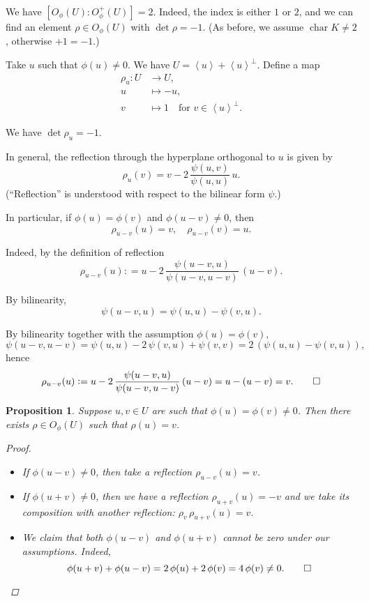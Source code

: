 \documentclass{article}
\newcommand{\dfn}{\mathrel{\mathop:}=}
\DeclareMathOperator{\fchar}{char}
\newcommand{\examplesymbol}{$\blacktriangle$}
\renewcommand{\qedsymbol}{$\blacksquare$}
\theoremstyle{myplain}
\newtheorem{proposition}{Proposition}[section]
\theoremstyle{mydefinition}
\newenvironment{example}
  {\pushQED{\qed}\renewcommand{\qedsymbol}{\examplesymbol}\examplex}
  {\popQED\endexamplex}
\begin{document}
We have $[O_\phi (U) : O_\phi^+ (U)] = 2$. Indeed, the index is either $1$ or
$2$, and we can find an element $\rho \in O_\phi (U)$ with $\det \rho = -1$.
(As before, we assume $\fchar K \ne 2$, otherwise $+1 = -1$.)

\begin{example}
  Take $u$ such that $\phi (u) \ne 0$. We have
  $U = \left<u\right> + \left<u\right>^\perp$. Define a map
  \begin{align*}
    \rho_u\colon U & \to U,\\
    u & \mapsto -u,\\
    v & \mapsto 1 \quad\text{for } v \in \left<u\right>^\perp.
  \end{align*}

  We have $\det \rho_u = -1$.

  In general, the reflection through the hyperplane orthogonal to $u$ is given
  by
  $$\rho_u (v) = v - 2\,\frac{\psi (u,v)}{\psi (u,u)}\,u.$$
  (``Reflection'' is understood with respect to the bilinear form $\psi$.)

  In particular, if $\phi (u) = \phi (v)$ and $\phi (u-v) \ne 0$, then
  $$\rho_{u-v} (u) = v, \quad \rho_{u-v} (v) = u.$$

  Indeed, by the definition of reflection
  $$\rho_{u-v} (u) \dfn u - 2\,\frac{\psi (u-v,u)}{\psi (u-v,u-v)}\,(u-v).$$

  By bilinearity,
  $$\psi (u - v, u) = \psi (u,u) - \psi (v,u).$$

  By bilinearity together with the assumption $\phi (u) = \phi (v)$,
  $$\psi (u-v, u-v) = \psi (u,u) - 2\,\psi (v,u) + \psi (v,v) = 2\,(\psi (u,u) - \psi (v,u)),$$
  hence
  \[ \rho_{u-v} (u) \dfn u - 2\,\frac{\psi (u-v,u)}{\psi (u-v,u-v)}\,(u-v) = u - (u-v) = v. \qedhere \]
\end{example}

\begin{proposition}\label{proposition:rho-u-v}
  Suppose $u,v \in U$ are such that $\phi (u) = \phi (v) \ne 0$. Then there
  exists $\rho \in O_\phi (U)$ such that $\rho (u) = v$.

  \begin{proof}
    \begin{itemize}
    \item If $\phi (u-v) \ne 0$, then take a reflection $\rho_{u-v} (u) = v$.

    \item If $\phi (u+v) \ne 0$, then we have a reflection $\rho_{u+v} (u) = -v$
      and we take its composition with another reflection:
      $\rho_v \, \rho_{u+v} (u) = v$.

    \item We claim that both $\phi (u-v)$ and $\phi (u+v)$ cannot be zero under
      our assumptions. Indeed,
      \[ \phi (u+v) + \phi (u-v) = 2\,\phi(u) + 2\,\phi(v) = 4\,\phi (v) \ne 0. \qedhere \]
    \end{itemize}
  \end{proof}
\end{proposition}
\end{document}
